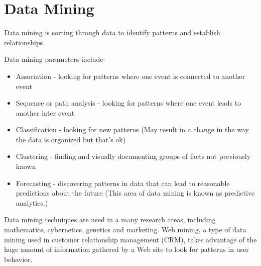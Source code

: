 \chapter{Data Mining}
Data mining is sorting through data to identify patterns and establish relationships.

Data mining parameters include:
\begin{itemize}
\item Association - looking for patterns where one event is connected to another event
\item Sequence or path analysis - looking for patterns where one event leads to another later event
\item Classification - looking for new patterns (May result in a change in the way the data is organized but that's ok)
\item Clustering - finding and visually documenting groups of facts not previously known
\item Forecasting - discovering patterns in data that can lead to reasonable predictions about the future (This area of data mining is known as predictive analytics.)
\end{itemize}

Data mining techniques are used in a many research areas, including mathematics, cybernetics, genetics and marketing. Web mining, a type of data mining used in customer relationship management (CRM), takes advantage of the huge amount of information gathered by a Web site to look for patterns in user behavior.
